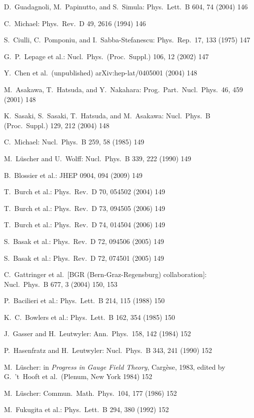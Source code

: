 \begin{enumerate}[label={[\arabic*]}]
  \item D.~Guadagnoli, M.~Papinutto, and S.~Simula: Phys.\ Lett.\ B 604, 74
        (2004) 146
  \item C.~Michael: Phys.\ Rev.\ D 49, 2616 (1994) 146
  \item S.~Ciulli, C.~Pomponiu, and I.~Sabba-Stefanescu: Phys.\ Rep.\ 17, 133
        (1975) 147
  \item G.~P.~Lepage et al.: Nucl.\ Phys.\ (Proc.\ Suppl.) 106, 12 (2002) 147
  \item Y.~Chen et al.\ (unpublished) arXiv:hep-lat/0405001 (2004) 148
  \item M.~Asakawa, T.~Hatsuda, and Y.~Nakahara: Prog.\ Part.\ Nucl.\ Phys.\ 46,
        459 (2001) 148
  \item K.~Sasaki, S.~Sasaki, T.~Hatsuda, and M.~Asakawa: Nucl.\ Phys.\ B
        (Proc.\ Suppl.) 129, 212 (2004) 148
  \item C.~Michael: Nucl.\ Phys.\ B 259, 58 (1985) 149
  \item M.~L\"uscher and U.~Wolff: Nucl.\ Phys.\ B 339, 222 (1990) 149
  \item B.~Blossier et al.: JHEP 0904, 094 (2009) 149
  \item T.~Burch et al.: Phys.\ Rev.\ D 70, 054502 (2004) 149
  \item T.~Burch et al.: Phys.\ Rev.\ D 73, 094505 (2006) 149
  \item T.~Burch et al.: Phys.\ Rev.\ D 74, 014504 (2006) 149
  \item S.~Basak et al.: Phys.\ Rev.\ D 72, 094506 (2005) 149
  \item S.~Basak et al.: Phys.\ Rev.\ D 72, 074501 (2005) 149
  \item C.~Gattringer et al.\ [BGR (Bern-Graz-Regensburg) collaboration]: Nucl.\
        Phys.\ B 677, 3 (2004) 150, 153
  \item P.~Bacilieri et al.: Phys.\ Lett.\ B 214, 115 (1988) 150
  \item K.~C.~Bowlers et al.: Phys.\ Lett.\ B 162, 354 (1985) 150
  \item J.~Gasser and H.~Leutwyler: Ann.\ Phys.\ 158, 142 (1984) 152
  \item P.~Hasenfratz and H.~Leutwyler: Nucl.\ Phys.\ B 343, 241 (1990) 152
  \item M.~L\"uscher: in \emph{Progress in Gauge Field Theory}, Carg\`ese, 1983,
        edited by G.~'t~Hooft et al.\ (Plenum, New York 1984) 152
  \item M.~L\"uscher: Commun.\ Math.\ Phys.\ 104, 177 (1986) 152
  \item M.~Fukugita et al.: Phys.\ Lett.\ B 294, 380 (1992) 152

\end{enumerate}
